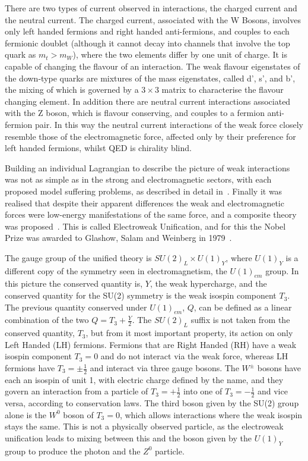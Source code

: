 There are two types of current observed in interactions, the charged current and the neutral current\cite{PichSM}. The charged current, associated with the W Bosons, involves only left handed fermions and right handed anti-fermions, and couples to each fermionic doublet (although it cannot decay into channels that involve the top quark as $m_{t} > m_{W}$), where the two elements differ by one unit of charge. It is capable of changing the flavour of an interaction. The weak flavour eigenstates of the down-type quarks are mixtures of the mass eigenstates, called d', s', and b', the mixing of which is governed by a $3\times 3$ matrix to characterise the flavour changing element.  In addition there are neutral current interactions associated with the Z boson, which is flavour conserving, and couples to a fermion anti-fermion pair. In this way the neutral current interactions of the weak force closely resemble those of the electromagnetic force, affected only by their preference for left handed fermions, whilst QED is chirality blind. 

Building an individual Lagrangian to describe the picture of weak interactions was not as simple as in the strong and electromagnetic sectors, with each proposed model suffering problems, as described in detail in~\cite{HerreroSM}. Finally it was realised that despite their apparent differences the weak and electromagnetic forces were low-energy manifestations of the same force, and a composite theory was proposed~\cite{Glashow}. This is called Electroweak Unification, and for this the Nobel Prize was awarded to Glashow, Salam and Weinberg in 1979~\cite{Breaking}. 

The gauge group of the unified theory is $SU(2)_{L} \times U(1)_{Y}$, where $U(1)_{Y}$ is a different copy of the symmetry seen in electromagnetism, the $U(1)_{em}$ group. In this picture the conserved quantity is, $Y$, the weak hypercharge, and the conserved quantity for the SU(2) symmetry is the weak isospin component $T_{3}$. The previous quantity conserved under $U(1)_{em}$, $Q$, can be defined as a linear combination of the two $Q = T_{3} + \frac{Y}{2}$.  The $SU(2)_{L}$ suffix is not taken from the conserved quantity, $T_{3}$, but from it most important property, its action on only Left Handed (LH) fermions. Fermions that are Right Handed (RH) have a weak isospin component $T_{3} = 0$ and do not interact via the weak force, whereas LH fermions have $T_{3} =  \pm \frac{1}{2}$ and interact via three gauge bosons. The $W^{\pm}$ bosons have each an isospin of unit 1, with electric charge defined by the name, and they govern an interaction from a particle of $T_{3}=+\frac{1}{2}$ into one of $T_{3}=-\frac{1}{2}$ and vice versa, according to conservation laws. The third boson given by the SU(2) group alone is the $W^{0}$ boson of $T_{3}=0$, which allows interactions where the weak isospin stays the same. This is not a physically observed particle, as the electroweak unification leads to mixing between this and the boson given by the $U(1)_{Y}$ group to produce the photon and the $Z^{0}$ particle.



